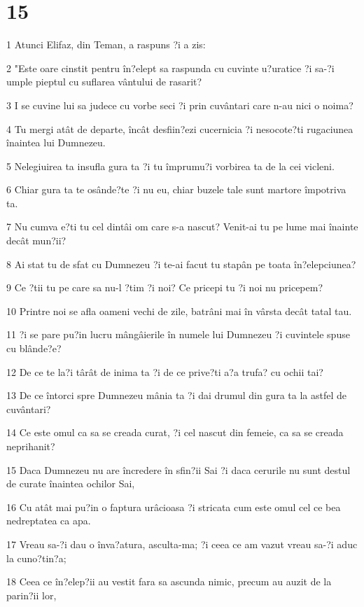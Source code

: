 \chapter{15}

\par 1 Atunci Elifaz, din Teman, a raspuns ?i a zis:
\par 2 "Este oare cinstit pentru în?elept sa raspunda cu cuvinte u?uratice ?i sa-?i umple pieptul cu suflarea vântului de rasarit?
\par 3 I se cuvine lui sa judece cu vorbe seci ?i prin cuvântari care n-au nici o noima?
\par 4 Tu mergi atât de departe, încât desfiin?ezi cucernicia ?i nesocote?ti rugaciunea înaintea lui Dumnezeu.
\par 5 Nelegiuirea ta insufla gura ta ?i tu împrumu?i vorbirea ta de la cei vicleni.
\par 6 Chiar gura ta te osânde?te ?i nu eu, chiar buzele tale sunt martore împotriva ta.
\par 7 Nu cumva e?ti tu cel dintâi om care s-a nascut? Venit-ai tu pe lume mai înainte decât mun?ii?
\par 8 Ai stat tu de sfat cu Dumnezeu ?i te-ai facut tu stapân pe toata în?elepciunea?
\par 9 Ce ?tii tu pe care sa nu-l ?tim ?i noi? Ce pricepi tu ?i noi nu pricepem?
\par 10 Printre noi se afla oameni vechi de zile, batrâni mai în vârsta decât tatal tau.
\par 11 ?i se pare pu?in lucru mângâierile în numele lui Dumnezeu ?i cuvintele spuse cu blânde?e?
\par 12 De ce te la?i târât de inima ta ?i de ce prive?ti a?a trufa? cu ochii tai?
\par 13 De ce întorci spre Dumnezeu mânia ta ?i dai drumul din gura ta la astfel de cuvântari?
\par 14 Ce este omul ca sa se creada curat, ?i cel nascut din femeie, ca sa se creada neprihanit?
\par 15 Daca Dumnezeu nu are încredere în sfin?ii Sai ?i daca cerurile nu sunt destul de curate înaintea ochilor Sai,
\par 16 Cu atât mai pu?in o faptura urâcioasa ?i stricata cum este omul cel ce bea nedreptatea ca apa.
\par 17 Vreau sa-?i dau o înva?atura, asculta-ma; ?i ceea ce am vazut vreau sa-?i aduc la cuno?tin?a;
\par 18 Ceea ce în?elep?ii au vestit fara sa ascunda nimic, precum au auzit de la parin?ii lor,
